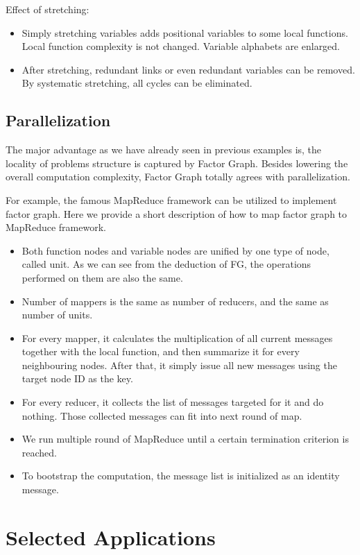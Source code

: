 \documentclass[11pt,a4paper]{article}
\begin{document}
Effect of stretching:
\begin{itemize}
	\item Simply stretching variables adds positional variables to some local functions.
	Local function complexity is not changed. Variable alphabets are enlarged. 
	\item After stretching, redundant links or even redundant variables can be removed. 
	By systematic stretching, all cycles can be eliminated. 
\end{itemize}

\subsection{Parallelization}

The major advantage as we have already seen in previous examples
is, the locality of problems structure is captured by Factor Graph. 
Besides lowering the overall computation complexity, Factor Graph 
totally agrees with parallelization. 

For example, the famous MapReduce framework can be utilized 
to implement factor graph. Here we provide a short description 
of how to map factor graph to MapReduce framework. 
\begin{itemize}
	\item Both function nodes and variable nodes are unified 
	by one type of node, called unit. As we can see from the deduction 
	of FG, the operations performed on them are also the same. 
	\item Number of mappers is the same as number of reducers, 
	and the same as number of units.
	\item For every mapper, it calculates the multiplication of 
	all current messages together with the local function, and then 
	summarize it for every neighbouring nodes. After that, 
	it simply issue all new messages using the target node ID as the key. 
	\item For every reducer, it collects the list of messages targeted 
	for it and do nothing. Those collected messages can fit into 
	next round of map. 
	\item We run multiple round of MapReduce until a certain termination 
	criterion is reached. 
	\item To bootstrap the computation, the message list is initialized 
	as an identity message. 
\end{itemize}


\section{Selected Applications}
\end{document}
